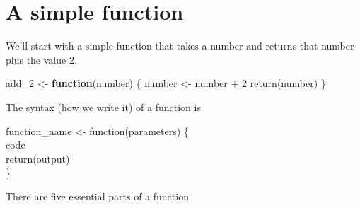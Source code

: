 \documentclass[
]{krantz}
\makeatletter
\newenvironment{Shaded}{\begin{snugshade}}{\end{snugshade}}
\newcommand{\ControlFlowTok}[1]{\textcolor[rgb]{0.27,0.27,0.27}{\textbf{#1}}}
\newcommand{\DecValTok}[1]{\textcolor[rgb]{0.06,0.06,0.06}{#1}}
\newcommand{\FunctionTok}[1]{\textcolor[rgb]{0,0,0}{#1}}
\newcommand{\NormalTok}[1]{#1}
\newcommand{\OtherTok}[1]{\textcolor[rgb]{0.37,0.37,0.37}{#1}}
\newcommand{\SpecialCharTok}[1]{\textcolor[rgb]{0,0,0}{#1}}
\newenvironment{kframe}{%
\medskip{}
\setlength{\fboxsep}{.8em}
 \def\at@end@of@kframe{}%
 \ifinner\ifhmode%
  \def\at@end@of@kframe{\end{minipage}}%
  \begin{minipage}{\columnwidth}%
 \fi\fi%
 \def\FrameCommand##1{\hskip\@totalleftmargin \hskip-\fboxsep
 \colorbox{shadecolor}{##1}\hskip-\fboxsep
     \hskip-\linewidth \hskip-\@totalleftmargin \hskip\columnwidth}%
 \MakeFramed {\advance\hsize-\width
   \@totalleftmargin\z@ \linewidth\hsize
   \@setminipage}}%
 {\par\unskip\endMakeFramed%
 \at@end@of@kframe}
\renewenvironment{Shaded}{\begin{kframe}}{\end{kframe}}
\makeatother
\begin{document}
\hypertarget{a-simple-function}{%
\section{A simple function}\label{a-simple-function}}

We'll start with a simple function that takes a number and returns that number plus the value 2.

\begin{Shaded}
\begin{Highlighting}[]
\NormalTok{add\_2 }\OtherTok{\textless{}{-}} \ControlFlowTok{function}\NormalTok{(number) \{}
\NormalTok{  number }\OtherTok{\textless{}{-}}\NormalTok{ number }\SpecialCharTok{+} \DecValTok{2}
  \FunctionTok{return}\NormalTok{(number)}
\NormalTok{\}}
\end{Highlighting}
\end{Shaded}

The syntax (how we write it) of a function is

function\_name \textless- function(parameters)
\{\\
code\\
return(output)\\
\}

There are five essential parts of a function
\end{document}
